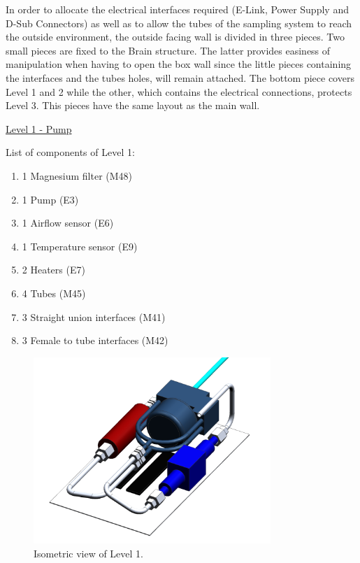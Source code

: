 \smallskip
In order to allocate the electrical interfaces required (E-Link, Power Supply and D-Sub Connectors) as well as to allow the tubes of the sampling system to reach the outside environment, the outside facing wall is divided in three pieces. Two small pieces are fixed to the Brain structure. The latter provides easiness of manipulation when having to open the box wall since the little pieces containing the interfaces and the tubes holes, will remain attached. The bottom piece covers Level 1 and 2 while the other, which contains the electrical connections, protects Level 3. This pieces have the same layout as the main wall. 


\pagebreak
\underline{Level 1 - Pump}

\smallskip
List of components of Level 1:

\begin{enumerate}[label=\Alph*.]
    \item 1 Magnesium filter (M48)
    \item 1 Pump (E3)
    \item 1 Airflow sensor (E6)
    \item 1 Temperature sensor (E9)
    \item 2 Heaters (E7)
    \item 4 Tubes (M45)
    \item 3 Straight union interfaces (M41)
    \item 3 Female to tube interfaces (M42)
\end{enumerate}


\begin{figure}[H]
    \centering
    \includegraphics[width=0.8\textwidth]{4-experiment-design/img/Mechanical/Level_1.png}
    \caption{Isometric view of Level 1.}
    \label{level_1}
\end{figure}

